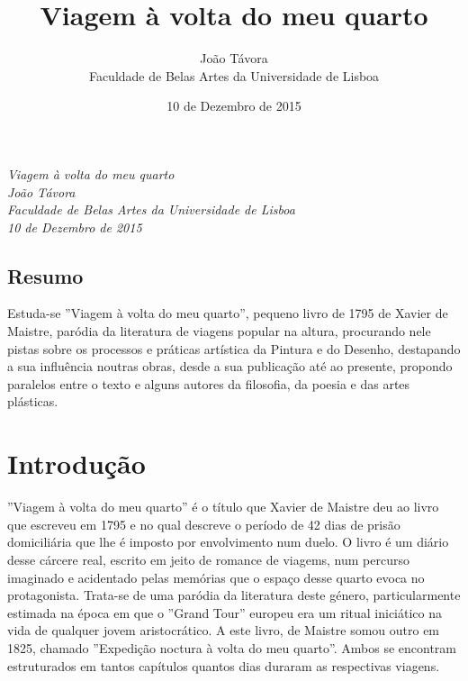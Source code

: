 \documentclass[12pt]{article}
\title{Viagem à volta do meu quarto}
\date{10 de Dezembro de 2015}
\author{João Távora \\Faculdade de Belas Artes da Universidade de Lisboa}
\begin{document}

\emph{Viagem à volta do meu quarto}\\
\emph{João Távora}\\
\emph{Faculdade de Belas Artes da Universidade de Lisboa}\\
\emph{10 de Dezembro de 2015}\\

\begin{spacing}{1.0}

\tableofcontents

\begin{small}
  \section{Resumo}

    \noindent Estuda-se ''Viagem à volta do meu quarto'', pequeno livro de 1795 de
    Xavier de Maistre, paródia da literatura de viagens popular na altura,
    procurando nele pistas sobre os processos e práticas artística da
    Pintura e do Desenho, destapando a sua influência noutras obras, desde
    a sua publicação até ao presente, propondo paralelos entre o texto e
    alguns autores da filosofia, da poesia e das artes plásticas.
\end{small}

\end{spacing}


\section{Introdução}

''Viagem à volta do meu quarto'' é o título que Xavier de Maistre deu
ao livro que escreveu em 1795 e no qual descreve o período de 42 dias
de prisão domiciliária que lhe é imposto por envolvimento num duelo. O
livro é um diário desse cárcere real, escrito em jeito de romance de
viagems, num percurso imaginado e acidentado pelas memórias que o
espaço desse quarto evoca no protagonista. Trata-se de uma paródia da
literatura deste género, particularmente estimada na época em que o
''Grand Tour'' europeu era um ritual iniciático na vida de qualquer
jovem aristocrático. A este livro, de Maistre somou outro em 1825,
chamado ''Expedição noctura à volta do meu quarto''. Ambos se
encontram estruturados em tantos capítulos quantos dias duraram as
respectivas viagens.
\end{document}
